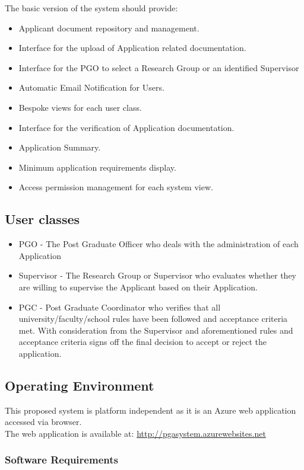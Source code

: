 \documentclass[]{article}
\begin{document}
The basic version of the system should provide:
\begin{itemize}
\item	Applicant document repository and management.
\item	Interface for the upload of Application related documentation.
\item	Interface for the PGO to select a Research Group or an identified Supervisor
\item	Automatic Email Notification for Users.
\item	Bespoke views for each user class.
\item 	Interface for the verification of Application documentation.
\item 	Application Summary.
\item 	Minimum application requirements display.
\item	Access permission management for each system view.
\end{itemize}
\subsection{User classes}
\begin{itemize}
\item PGO  - The Post Graduate Officer who deals with the administration of each Application 
\item Supervisor - The Research Group or Supervisor who evaluates whether they are willing to supervise the Applicant based on their Application.
\item PGC - Post Graduate Coordinator who verifies that all university/faculty/school rules have been followed and acceptance criteria met. With consideration from the Supervisor and aforementioned rules and acceptance criteria signs off the final decision to accept or reject the application.

\end{itemize}
\subsection{Operating Environment}

This proposed system is platform independent as it is an Azure web application accessed via browser. \\
The web application is available at: \href{http://pgasystem.azurewebsites.net}{http://pgasystem.azurewebsites.net}

\subsubsection{Software Requirements}
\end{document}
